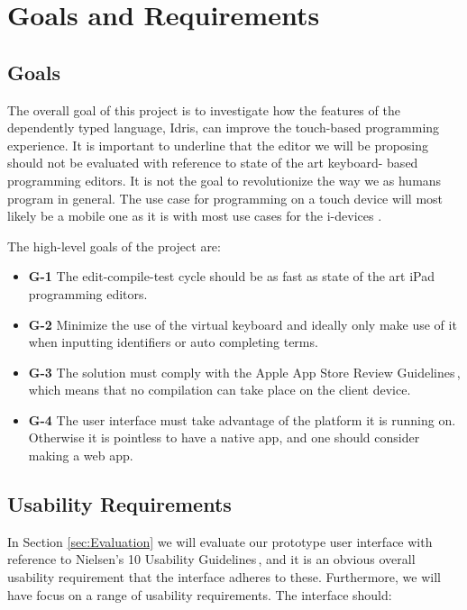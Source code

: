\section{Goals and Requirements}

\subsection{Goals} The overall goal of this project is to investigate how the
features of the dependently typed language, Idris, can improve the touch-based
programming experience. It is important to underline that the editor we will be
proposing should not be evaluated with reference to state of the art keyboard-
based programming editors. It is not the goal to revolutionize the way we as
humans program in general. The use case for programming on a touch device will most likely be a
mobile one as it is with most use cases for the i-devices \cite[p. 26]{nielsen2013mobile}.

The high-level goals of the project are:

\begin{itemize} 
	\item \textbf{G-1} The edit-compile-test cycle should be as fast as state of the art iPad 
	programming editors.
	\item \textbf{G-2} Minimize the use of the virtual keyboard\cite[pp. 76]{nielsen2013mobile} and
	ideally only make use of it when inputting identifiers or auto completing terms.
	\item \textbf{G-3} The solution must comply with the Apple App Store Review 
	Guidelines\,\cite{AppStoreGuidelines}, which means that no compilation can take place on 
	the client device.
	\item \textbf{G-4} The user interface must take advantage of the platform it is running on. 
	Otherwise it is pointless to have a native app, and one should consider making a web app.
\end{itemize}

\subsection{Usability Requirements} 
In Section \ref{sec:Evaluation} we will evaluate our prototype user interface with reference to Nielsen's 10 Usability
Guidelines\,\cite{nielsen1990heuristic}, and it is an obvious overall usability
requirement that the interface adheres to these. Furthermore, we will have focus on a range of
usability requirements. The interface should:

